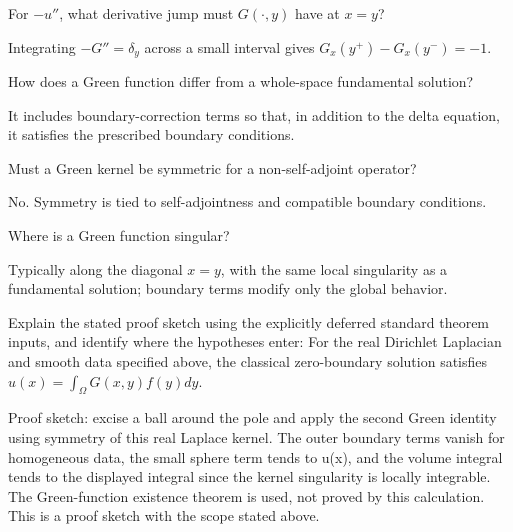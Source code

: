 \begin{problem}\label{prob:iii25-problem-05}
For \(-u''\), what derivative jump must \(G(\cdot,y)\) have at \(x=y\)?
\end{problem}
\begin{solution}
Integrating \(-G''=\delta_y\) across a small interval gives
\(G_x(y^+)-G_x(y^-)=-1\).
\end{solution}

\begin{problem}\label{prob:iii25-problem-06}
How does a Green function differ from a whole-space fundamental solution?
\end{problem}
\begin{solution}
It includes boundary-correction terms so that, in addition to the delta
equation, it satisfies the prescribed boundary conditions.
\end{solution}

\begin{problem}\label{prob:iii25-problem-07}
Must a Green kernel be symmetric for a non-self-adjoint operator?
\end{problem}
\begin{solution}
No. Symmetry is tied to self-adjointness and compatible boundary
conditions.
\end{solution}

\begin{problem}\label{prob:iii25-problem-08}
Where is a Green function singular?
\end{problem}
\begin{solution}
Typically along the diagonal \(x=y\), with the same local singularity as a
fundamental solution; boundary terms modify only the global behavior.
\end{solution}

\begin{problem}\label{prob:iii25-problem-09}
Explain the stated proof sketch using the explicitly deferred standard theorem inputs, and identify where the hypotheses enter: For the real Dirichlet Laplacian and smooth data specified above, the classical zero-boundary solution satisfies $u(x)=\int_\Omega G(x,y)f(y)dy$.
\end{problem}
\begin{solution}
Proof sketch: excise a ball around the pole and apply the second Green identity using symmetry of this real Laplace kernel. The outer boundary terms vanish for homogeneous data, the small sphere term tends to u(x), and the volume integral tends to the displayed integral since the kernel singularity is locally integrable. The Green-function existence theorem is used, not proved by this calculation. This is a proof sketch with the scope stated above.
\end{solution}

